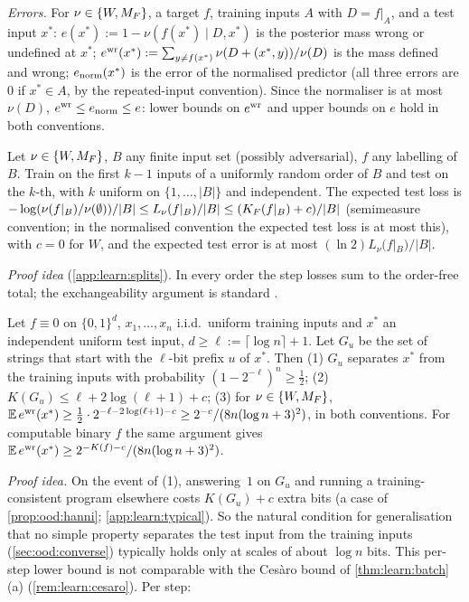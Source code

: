 \emph{Errors.} For $\nu\in\{W,M_{F}\}$, a target $f$, training inputs $A$ with $D=f|_A$, and a test input $x^*$: $e(x^*):=1-\nu(f(x^*)\mid D,x^*)$ is the posterior mass wrong or undefined at $x^*$; $e^{\rm wr}(x^*):=\sum_{y\ne f(x^*)}\nu(D+(x^*,y))/\nu(D)$ is the mass defined and wrong; $e_{\rm norm}(x^*)$ is the error of the normalised predictor (all three errors are $0$ if $x^*\in A$, by the repeated-input convention). Since the normaliser is at most $\nu(D)$, $e^{\rm wr}\le e_{\rm norm}\le e$: lower bounds on $e^{\rm wr}$ and upper bounds on $e$ hold in both conventions.

\begin{proposition}\label{prop:learn:splits}
Let $\nu\in\{W,M_{F}\}$, $B$ any finite input set (possibly adversarial), $f$ any labelling of $B$. Train on the first $k-1$ inputs of a uniformly random order of $B$ and test on the $k$-th, with $k$ uniform on $\{1,\dots,|B|\}$ and independent. The expected test loss is $-\log(\nu(f|_B)/\nu(\emptyset))/|B|\le L_\nu(f|_B)/|B|\le(K_{F}(f|_B)+c)/|B|$ (semimeasure convention; in the normalised convention the expected test loss is at most this), with $c=0$ for $W$, and the expected test error is at most $(\ln2)L_\nu(f|_B)/|B|$.
\end{proposition}

\emph{Proof idea} (\cref{app:learn:splits}). In every order the step losses sum to the order-free total; the exchangeability argument is standard \citep{cesabianchi2004generalization}.

\begin{proposition}\label{prop:learn:typical}
Let $f\equiv0$ on $\{0,1\}^d$, $x_1,\dots,x_n$ i.i.d.\ uniform training inputs and $x^*$ an independent uniform test input, $d\ge\ell:=\lceil\log n\rceil+1$. Let $G_u$ be the set of strings that start with the $\ell$-bit prefix $u$ of $x^*$. Then (1) $G_u$ separates $x^*$ from the training inputs with probability $(1-2^{-\ell})^n\ge\frac12$; (2) $K(G_u)\le\ell+2\log(\ell+1)+c$; (3) for $\nu\in\{W,M_{F}\}$, $\mathbb{E}\,e^{\rm wr}(x^*)\ge\frac12\cdot2^{-\ell-2\log(\ell+1)-c}\ge2^{-c}/(8n(\log n+3)^2)$, in both conventions. For computable binary $f$ the same argument gives $\mathbb{E}\,e^{\rm wr}(x^*)\ge2^{-K(f)-c}/(8n(\log n+3)^2)$.
\end{proposition}

\emph{Proof idea.} On the event of (1), answering~$1$ on $G_u$ and running a training-consistent program elsewhere costs $K(G_u)+c$ extra bits (a case of \cref{prop:ood:hanni}; \cref{app:learn:typical}). So the natural condition for generalisation that no simple property separates the test input from the training inputs (\cref{sec:ood:converse}) typically holds only at scales of about $\log n$ bits. This per-step lower bound is not comparable with the Ces\`aro bound of \cref{thm:learn:batch}(a) (\cref{rem:learn:cesaro}). Per step:

